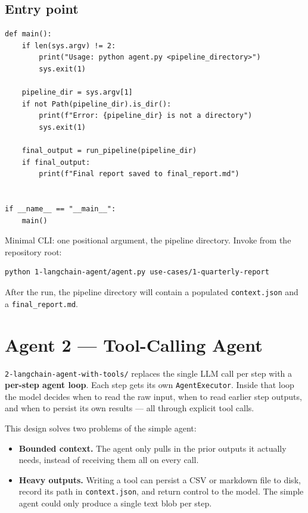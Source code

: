 \documentclass[12pt, a4paper]{article}
\begin{document}
\subsection{Entry point}

\begin{lstlisting}[style=pythonstyle]
def main():
    if len(sys.argv) != 2:
        print("Usage: python agent.py <pipeline_directory>")
        sys.exit(1)

    pipeline_dir = sys.argv[1]
    if not Path(pipeline_dir).is_dir():
        print(f"Error: {pipeline_dir} is not a directory")
        sys.exit(1)

    final_output = run_pipeline(pipeline_dir)
    if final_output:
        print(f"Final report saved to final_report.md")


if __name__ == "__main__":
    main()
\end{lstlisting}

Minimal CLI: one positional argument, the pipeline directory. Invoke from the repository root:

\begin{lstlisting}[style=shellstyle]
python 1-langchain-agent/agent.py use-cases/1-quarterly-report
\end{lstlisting}

After the run, the pipeline directory will contain a populated \texttt{context.json} and a \texttt{final\_report.md}.

\section{Agent 2 — Tool-Calling Agent}

\texttt{2-langchain-agent-with-tools/} replaces the single LLM call per step with a \textbf{per-step agent loop}. Each step gets its own \texttt{AgentExecutor}. Inside that loop the model decides when to read the raw input, when to read earlier step outputs, and when to persist its own results — all through explicit tool calls.

This design solves two problems of the simple agent:

\begin{itemize}[leftmargin=1.5em]
  \item \textbf{Bounded context.} The agent only pulls in the prior outputs it actually needs, instead of receiving them all on every call.
  \item \textbf{Heavy outputs.} Writing a tool can persist a CSV or markdown file to disk, record its path in \texttt{context.json}, and return control to the model. The simple agent could only produce a single text blob per step.
\end{itemize}
\end{document}
